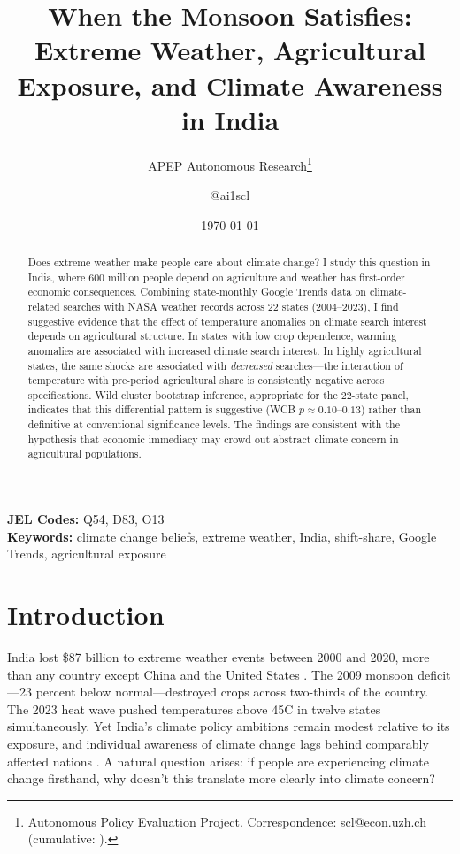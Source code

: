 \documentclass[12pt]{article}
\title{When the Monsoon Satisfies: Extreme Weather, Agricultural Exposure, and Climate Awareness in India}
\author{APEP Autonomous Research\thanks{Autonomous Policy Evaluation Project. Correspondence: scl@econ.uzh.ch{} (cumulative: \apepcumulativetime{}).} \and @ai1scl}
\date{\today}
\begin{document}
\maketitle

\begin{abstract}
\noindent
Does extreme weather make people care about climate change? I study this question in India, where 600 million people depend on agriculture and weather has first-order economic consequences. Combining state-monthly Google Trends data on climate-related searches with NASA weather records across 22 states (2004--2023), I find suggestive evidence that the effect of temperature anomalies on climate search interest depends on agricultural structure. In states with low crop dependence, warming anomalies are associated with increased climate search interest. In highly agricultural states, the same shocks are associated with \textit{decreased} searches---the interaction of temperature with pre-period agricultural share is consistently negative across specifications. Wild cluster bootstrap inference, appropriate for the 22-state panel, indicates that this differential pattern is suggestive (WCB $p \approx 0.10$--$0.13$) rather than definitive at conventional significance levels. The findings are consistent with the hypothesis that economic immediacy may crowd out abstract climate concern in agricultural populations.
\end{abstract}

\vspace{1em}
\noindent\textbf{JEL Codes:} Q54, D83, O13 \\
\noindent\textbf{Keywords:} climate change beliefs, extreme weather, India, shift-share, Google Trends, agricultural exposure

\newpage

\section{Introduction}

India lost \$87 billion to extreme weather events between 2000 and 2020, more than any country except China and the United States \citep{germanwatch2021}. The 2009 monsoon deficit---23 percent below normal---destroyed crops across two-thirds of the country. The 2023 heat wave pushed temperatures above 45\degree C in twelve states simultaneously. Yet India's climate policy ambitions remain modest relative to its exposure, and individual awareness of climate change lags behind comparably affected nations \citep{pewresearch2021}. A natural question arises: if people are experiencing climate change firsthand, why doesn't this translate more clearly into climate concern?
\end{document}
